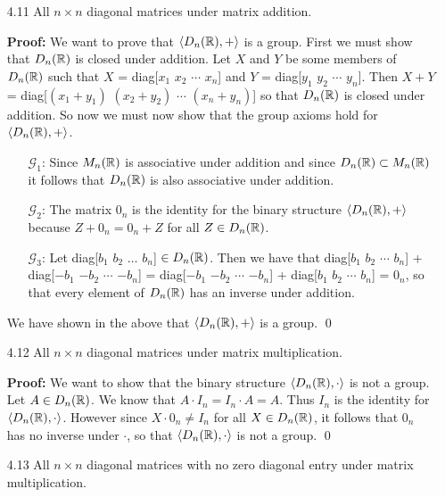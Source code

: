 \begin{enumerate}
   \item[4.11] All $n \times n$ diagonal matrices under matrix addition.
	
		\textbf{Proof:} We want to prove that $\langle D_n(\mathbb{R}), + \rangle$ is a group. First
      we must show that $D_n(\mathbb{R})$ is closed under addition. Let $X$ and $Y$ be
      some members of $D_n(\mathbb{R})$ such that $X$ = diag[$x_1$ $x_2$ $\cdots$ $x_n$]
      and $Y$ = diag[$y_1$ $y_2$ $\cdots$ $y_n$]. Then $X + Y$ = diag[$(x_1 + 
      y_1)$ $(x_2 + y_2)$ $\cdots$ $(x_n + y_n)$] so that $D_n(\mathbb{R})$ is closed 
      under addition. So now we must now show that the group axioms hold for
      $\langle D_n(\mathbb{R}), + \rangle$.
		\begin{enumerate}
			\item[$\mathscr{G}_1$:] Since $M_n(\mathbb{R})$ is associative under addition
											and since $D_n(\mathbb{R}) \subset M_n(\mathbb{R})$ it follows
											that $D_n(\mathbb{R})$ is also associative under
											addition.
											
			\item[$\mathscr{G}_2$:] The matrix $0_n$ is the identity for the binary
											structure $\langle D_n(\mathbb{R}), + \rangle$ because
											$Z + 0_n = 0_n + Z$ for all $Z \in D_n(\mathbb{R})$.
			\item[$\mathscr{G}_3$:] Let diag[$b_1$ $b_2$ $\ldots$ $b_n$]
											$\in D_n(\mathbb{R})$. Then we have that
											diag[$b_1$ $b_2$ $\cdots$ $b_n$] +
											diag[$-b_1$ $-b_2$ $\cdots$ $-b_n$] =
											diag[$-b_1$ $-b_2$ $\cdots$ $-b_n$] +
											diag[$b_1$ $b_2$ $\cdots$ $b_n$] = $0_n$,
											so that every element of $D_n(\mathbb{R})$ has an
											inverse under addition.
		\end{enumerate}
		
		We have shown in the above that $\langle D_n(\mathbb{R}), + \rangle$ is a group. \qed
   \item[4.12] All $n \times n$ diagonal matrices under matrix multiplication.
	
		\textbf{Proof:} We want to show that the binary structure
		$\langle D_n(\mathbb{R}), \cdot \rangle$ is not a group. Let $A \in  D_n(\mathbb{R})$. We know that
		$A \cdot I_n = I_n \cdot A = A$. Thus $I_n$ is the identity for
		$\langle D_n(\mathbb{R}), \cdot \rangle$. However since $X \cdot 0_n \neq I_n$ for all
		$X \in D_n(\mathbb{R})$, it follows that $0_n$ has no inverse under	$\cdot$, so
		that $\langle D_n(\mathbb{R}), \cdot \rangle$ is not a group. \qed
   \item[4.13] All $n \times n$ diagonal matrices with no zero diagonal entry 
               under matrix multiplication.
	

\end{enumerate}
